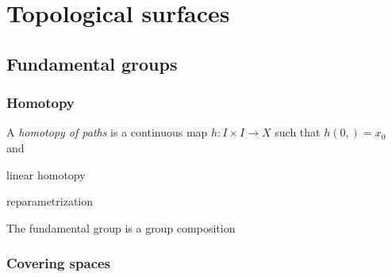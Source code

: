 \documentclass{../../large}
\begin{document}
\iffalse
\section{Symmetry groups}
isometry, conformal, rigid motion, etc.
\section{Discrete subgroups}
continuous group actions?
(convex, locally finite) fundamental domains
tesselation, polygon theorem
Fuchsian and Kleinian
\fi




\part{Topological surfaces}


\chapter{Fundamental groups}

\section{Homotopy}
\begin{prb}
A \emph{homotopy of paths} is a continuous map $h:I\times I\to X$ such that $h(0,)=x_0$ and 
\begin{parts}
\item linear homotopy
\item reparametrization
\end{parts}
\end{prb}
\begin{prb}
The fundamental group is a group
composition
\end{prb}

\begin{prb}
\end{prb}

\section{Covering spaces}

\end{document}
